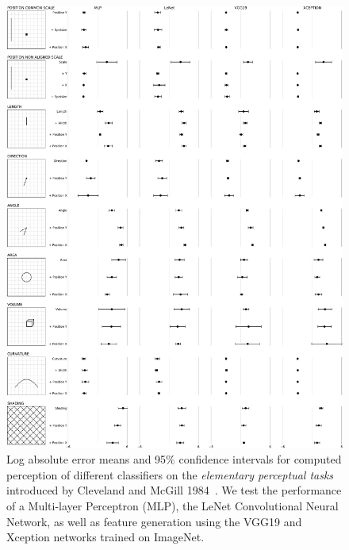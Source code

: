 \documentclass[journal]{vgtc}                %
\begin{document}
\begin{figure}[h]
	  \includegraphics[width=\linewidth]{figure1.pdf}
  \caption{Log absolute error means and 95\% confidence intervals for computed perception of different classifiers on the \emph{elementary perceptual tasks} introduced by Cleveland and McGill 1984~\cite{cleveland_mcgill}. We test the performance of a Multi-layer Perceptron (MLP), the LeNet Convolutional Neural Network, as well as feature generation using the VGG19 and Xception networks trained on ImageNet.}
	\label{fig:figure1_results}
\end{figure}
\end{document}
